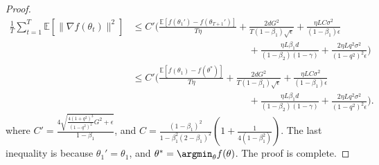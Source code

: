 \documentclass[11pt]{article}
\begin{document}
\begin{proof}
\begin{align*}
    \frac{1}{T}\sum_{t=1}^T \mathbb E[\|\nabla f(\theta_t)\|^2]&\leq C'\Big(\frac{\mathbb E[f(\theta_1')-f(\theta_{T+1}')]}{T\eta}+\frac{2dG^2}{T(1-\beta_1)\sqrt\epsilon}+\frac{\eta LC\sigma^2}{(1-\beta_1)\epsilon}\\
    &\hspace{2in} +\frac{\eta L\beta_1 d}{(1-\beta_2)(1-\gamma)}+\frac{2\eta L q^2\sigma^2}{(1-q^2)^2\epsilon}\Big)\\
    &\leq C'\Big(\frac{\mathbb E[f(\theta_1)-f(\theta^*)]}{T\eta}+\frac{2dG^2}{T(1-\beta_1)\sqrt\epsilon}+\frac{\eta LC\sigma^2}{(1-\beta_1)\epsilon}\\
    &\hspace{2in} +\frac{\eta L\beta_1 d}{(1-\beta_2)(1-\gamma)}+\frac{2\eta L q^2\sigma^2}{(1-q^2)^2\epsilon}\Big).
\end{align*}
where $C'=\frac{4\sqrt{\frac{4(1+q^2)^3}{(1-q^2)^2}G^2+\epsilon}}{1-\beta_1}$, and $C=\frac{(1-\beta_1)^2}{1-\beta_1^2(2-\beta_1)^2}(1+\frac{1}{4(1-\beta_1^2)})$. The last inequality is because $\theta_1'=\theta_1$, and $\theta^*=\argmin_\theta f(\theta)$. The proof is complete.

\end{proof}
\end{document}
